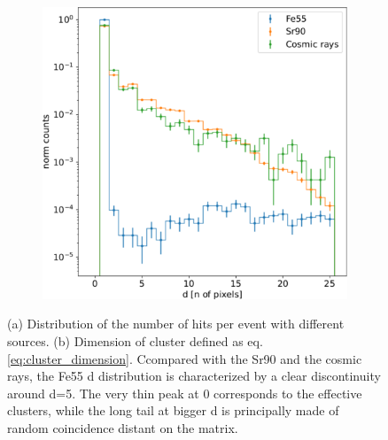 \begin{figure}
\begin{subfigure}[b]{0.49\textwidth}
                \includegraphics[width=\linewidth]{figures/charaterization/cluster_dimension.pdf}
                \caption{}
                \label{fig:cluster_dimension}
            \end{subfigure}
            \caption{(a) Distribution of the number of hits per event with different sources. (b) Dimension of cluster defined as eq.\ref{eq:cluster_dimension}. Ccompared with the Sr90 and the cosmic rays, the Fe55 d distribution is characterized by a clear discontinuity around d=5. The very thin peak at 0 corresponds to the effective clusters, while the long tail at bigger d is principally made of random coincidence distant on the matrix.}
            \label{fig:cluster_dimension}
            \end{figure}  

